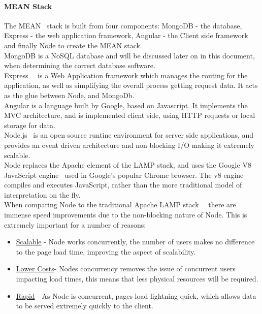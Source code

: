 \documentclass[draft,preprint,12pt,3p]{elsarticle}
\begin{document}
\paragraph{MEAN Stack}
The MEAN~\cite{mean} stack is built from four components: MongoDB - the database, Express - the web application framework, Angular - the Client side framework and finally Node to create the MEAN stack.\\
MongoDB is a NoSQL database and will be discussed later on in this document, when determining the correct database software.\\
Express~\cite{express}~\cite{whatisexpress} is a Web Application framework which manages the routing for the application, as well as simplifying the overall process getting request data. It acts as the glue between Node, and MongoDb.\\
Angular is a language built by Google, based on Javascript. It implements the MVC architecture, and is implemented client side, using HTTP requests or local storage for data.\\
Node.js~\cite{nodejs} is an open source runtine environment for server side applications, and provides an event driven architecture and non blocking I/O making it extremely scalable.\\
Node replaces the Apache element of the LAMP stack, and uses the Google V8 JavaScript engine~\cite{v8engine} used in Google's popular Chrome browser. The v8 engine compiles and executes JavaScript, rather than the more traditional model of interpretation on the fly.\\
When comparing Node to the traditional Apache LAMP stack~\cite{phpvsnodejs}~\cite{nodejsvsapache} there are immense speed improvements due to the non-blocking nature of Node. This is extremely important for a number of reasons:
\begin{itemize}
  \item \underline{Scalable} - Node works concurrently, the number of users makes no difference to the page load time, improving the aspect of scalability.
  \item \underline{Lower Costs}- Nodes concurrency removes the issue of concurrent users impacting load times, this means that less physical resources will be required.
  \item \underline{Rapid} - As Node is concurrent, pages load lightning quick, which allows data to be served extremely quickly to the client.
\end{itemize}
\end{document}
